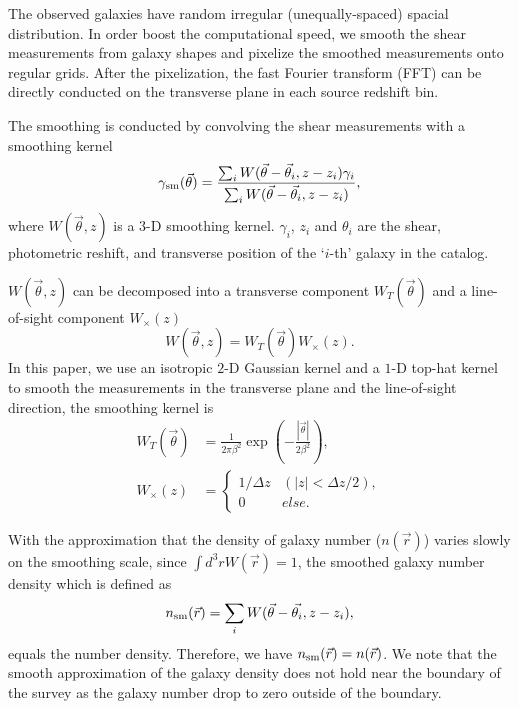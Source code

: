 \documentclass[twocolumn]{aastex62}
\begin{document}
The observed galaxies have random irregular (unequally-spaced) spacial distribution. In order boost the computational
speed, we smooth the shear measurements from galaxy shapes and pixelize the smoothed measurements onto regular grids.
After the pixelization, the fast Fourier transform (FFT) can be directly conducted on the transverse plane in each 
source redshift bin.

The smoothing is conducted by convolving the shear measurements with a smoothing kernel
\begin{equation}
\gamma_{\rm{sm}} (\vec{\theta})  = \frac{\sum_i  W(\vec{\theta}-\vec{{\theta}}_i,z-z_i) \gamma_i}{\sum_i W(\vec{\theta}-\vec{{\theta}}_i,z-z_i) },
\end{equation}
where $W(\vec{\theta},z)$ is a $3$-D smoothing kernel. $\gamma_i$, $z_i$ and $\theta_i$ are the shear,
photometric reshift, and transverse position of the `$i$-th' galaxy in the catalog.

$W(\vec{\theta},z)$ can be decomposed into a transverse component $W_T(\vec{\theta})$ and a line-of-sight component
$W_\times(z)$
\begin{equation}
W(\vec{\theta},z)=W_T(\vec{\theta}) W_\times (z).
\end{equation}
In this paper, we use an isotropic $2$-D Gaussian kernel and a $1$-D top-hat kernel to smooth the measurements in the 
transverse plane and the line-of-sight direction, the smoothing kernel is 
\begin{equation}
\begin{split}
W_T(\vec{\theta}) &=\frac{1}{2\pi\beta^2}\exp(-\frac{|\vec{\theta}|}{2\beta^2}),\\
W_\times (z) &=
\begin{cases}
1/\Delta z& (|z|<\Delta z/2),\\
0& else.
\end{cases}
\end{split}
\end{equation}

With the approximation that the density of galaxy number ($n(\vec{r})$) varies slowly on the smoothing scale, 
since $\int d^3r W(\vec{r})=1$, the smoothed galaxy number density which is defined as
$$n_{\rm{sm}}(\vec{r})=\sum_i W(\vec{\theta}-\vec{\theta_i},z-z_i),$$
equals the number density. Therefore, we have $n_{\rm{sm}}(\vec{r})=n(\vec{r})$.
We note that the smooth approximation of the galaxy density does not hold near the boundary of the survey as
the galaxy number drop to zero outside of the boundary.
\end{document}
